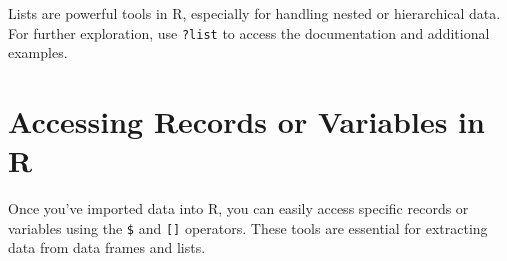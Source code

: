 \documentclass[
  11pt,
]{book}
\makeatletter
\newenvironment{Shaded}{}{}
\newcommand{\DecValTok}[1]{#1}
\newcommand{\FunctionTok}[1]{#1}
\newcommand{\NormalTok}[1]{#1}
\newcommand{\SpecialCharTok}[1]{\textcolor[rgb]{0.39,0.39,0.39}{#1}}
\newcommand{\StringTok}[1]{\textcolor[rgb]{0.39,0.39,0.39}{#1}}
\newenvironment{kframe}{%
\medskip{}
\setlength{\fboxsep}{.8em}
 \def\at@end@of@kframe{}%
 \ifinner\ifhmode%
  \def\at@end@of@kframe{\end{minipage}}%
  \begin{minipage}{\columnwidth}%
 \fi\fi%
 \def\FrameCommand##1{\hskip\@totalleftmargin \hskip-\fboxsep
 \colorbox{shadecolor}{##1}\hskip-\fboxsep
     \hskip-\linewidth \hskip-\@totalleftmargin \hskip\columnwidth}%
 \MakeFramed {\advance\hsize-\width
   \@totalleftmargin\z@ \linewidth\hsize
   \@setminipage}}%
 {\par\unskip\endMakeFramed%
 \at@end@of@kframe}
\renewenvironment{Shaded}{\begin{kframe}}{\end{kframe}}
\theoremstyle{definition}
\theoremstyle{definition}
\theoremstyle{definition}
\theoremstyle{definition}
\theoremstyle{remark}
\makeatother
\begin{document}
\begin{Shaded}
\end{Shaded}

Lists are powerful tools in R, especially for handling nested or hierarchical data. For further exploration, use \texttt{?list} to access the documentation and additional examples.

\section{Accessing Records or Variables in R}\label{accessing-records-or-variables-in-r}

Once you've imported data into R, you can easily access specific records or variables using the \texttt{\$} and \texttt{{[}{]}} operators. These tools are essential for extracting data from data frames and lists.
\end{document}
